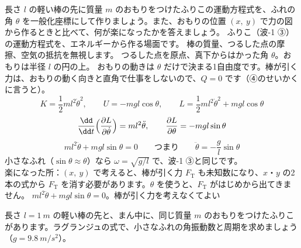 \label{ph:波-3:ex3}
\begin{phreidai}
長さ $l$ の軽い棒の先に質量 $m$ のおもりをつけたふりこの運動方程式を、ふれの角 $\theta$ を一般化座標にして作りましょう。また、おもりの位置 $(x,\ y)$ で力の図から作るときと比べて、何が楽になったかを答えましょう。
\phbamen
ふりこ（波-1 ③）の運動方程式を、エネルギーから作る場面です。
\phmushi
棒の質量、つるした点の摩擦、空気の抵抗を無視します。
\phzu
つるした点を原点、真下からはかった角 $\theta$。おもりは半径 $l$ の円の上。
\phriyu
おもりの動きは $\theta$ だけで決まる1自由度です。棒が引く力は、おもりの動く向きと直角で仕事をしないので、$Q=0$ です（④のせいかくに言うと）。
\phtateru
\[K=\frac12ml^2\dot\theta^2,\qquad U=-mgl\cos\theta,\qquad L=\frac12ml^2\dot\theta^2+mgl\cos\theta\]
\phtoku
\[\frac{\dd}{\dd t}\Bigl(\frac{\partial L}{\partial\dot\theta}\Bigr)=ml^2\ddot\theta,\qquad\frac{\partial L}{\partial\theta}=-mgl\sin\theta\]
\[ml^2\ddot\theta+mgl\sin\theta=0\qquad\text{つまり}\qquad\ddot\theta=-\frac{g}{l}\sin\theta\]
\phtashikame
小さなふれ（$\sin\theta\approx\theta$）なら $\omega=\sqrt{g/l}$ で、波-1 ③と同じです。\\
楽になった所：$(x,\ y)$ で考えると、棒が引く力 $F_{\mathrm T}$ も未知数になり、$x$・$y$ の2本の式から $F_{\mathrm T}$ を消す必要があります。$\theta$ を使うと、$F_{\mathrm T}$ がはじめから出てきません。
\kotae $ml^2\ddot\theta+mgl\sin\theta=0$。棒が引く力を考えなくてよい
\end{phreidai}
\begin{jibun}
長さ $l=\qty{1}{m}$ の軽い棒の先と、まん中に、同じ質量 $m$ のおもりをつけたふりこがあります。ラグランジュの式で、小さなふれの角振動数と周期を求めましょう（$g=\qty{9.8}{m/s^2}$）。
\end{jibun}

